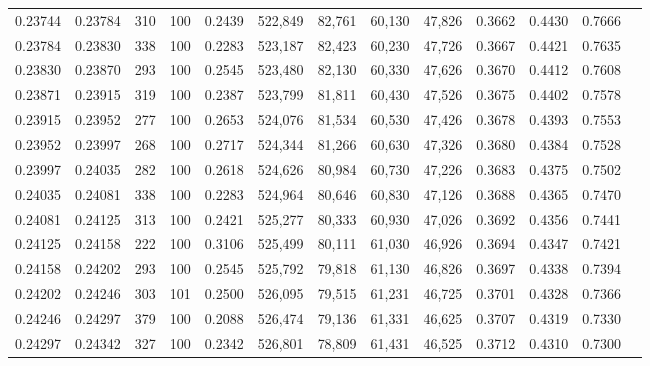 \begin{tabular}{rrrrrrrrrrrrr}
0.23744 & 0.23784 &   310 & 100 &                                     0.2439 & 522,849 &  82,761 &  60,130 &  47,826 & 0.3662 & 0.4430 & 0.7666 \\
0.23784 & 0.23830 &   338 & 100 &                                     0.2283 & 523,187 &  82,423 &  60,230 &  47,726 & 0.3667 & 0.4421 & 0.7635 \\
0.23830 & 0.23870 &   293 & 100 &                                     0.2545 & 523,480 &  82,130 &  60,330 &  47,626 & 0.3670 & 0.4412 & 0.7608 \\
0.23871 & 0.23915 &   319 & 100 &                                     0.2387 & 523,799 &  81,811 &  60,430 &  47,526 & 0.3675 & 0.4402 & 0.7578 \\
0.23915 & 0.23952 &   277 & 100 &                                     0.2653 & 524,076 &  81,534 &  60,530 &  47,426 & 0.3678 & 0.4393 & 0.7553 \\
0.23952 & 0.23997 &   268 & 100 &                                     0.2717 & 524,344 &  81,266 &  60,630 &  47,326 & 0.3680 & 0.4384 & 0.7528 \\
0.23997 & 0.24035 &   282 & 100 &                                     0.2618 & 524,626 &  80,984 &  60,730 &  47,226 & 0.3683 & 0.4375 & 0.7502 \\
0.24035 & 0.24081 &   338 & 100 &                                     0.2283 & 524,964 &  80,646 &  60,830 &  47,126 & 0.3688 & 0.4365 & 0.7470 \\
0.24081 & 0.24125 &   313 & 100 &                                     0.2421 & 525,277 &  80,333 &  60,930 &  47,026 & 0.3692 & 0.4356 & 0.7441 \\
0.24125 & 0.24158 &   222 & 100 &                                     0.3106 & 525,499 &  80,111 &  61,030 &  46,926 & 0.3694 & 0.4347 & 0.7421 \\
0.24158 & 0.24202 &   293 & 100 &                                     0.2545 & 525,792 &  79,818 &  61,130 &  46,826 & 0.3697 & 0.4338 & 0.7394 \\
0.24202 & 0.24246 &   303 & 101 &                                     0.2500 & 526,095 &  79,515 &  61,231 &  46,725 & 0.3701 & 0.4328 & 0.7366 \\
0.24246 & 0.24297 &   379 & 100 &                                     0.2088 & 526,474 &  79,136 &  61,331 &  46,625 & 0.3707 & 0.4319 & 0.7330 \\
0.24297 & 0.24342 &   327 & 100 &                                     0.2342 & 526,801 &  78,809 &  61,431 &  46,525 & 0.3712 & 0.4310 & 0.7300 \\

\end{tabular}
